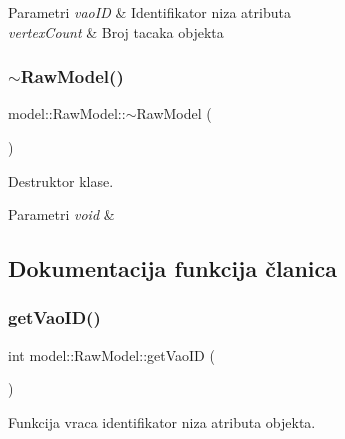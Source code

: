 \begin{DoxyParams}{Parametri}
{\em vao\+ID} & Identifikator niza atributa \\
\hline
{\em vertex\+Count} & Broj tacaka objekta \\
\hline
\end{DoxyParams}
\mbox{\label{classmodel_1_1RawModel_a44e687484478b0747abe25baa3533b71}} 
\subsubsection{\texorpdfstring{$\sim$\+Raw\+Model()}{~RawModel()}}
{\footnotesize\ttfamily model\+::\+Raw\+Model\+::$\sim$\+Raw\+Model (\begin{DoxyParamCaption}{ }\end{DoxyParamCaption})}



Destruktor klase. 


\begin{DoxyParams}{Parametri}
{\em void} & \\
\hline
\end{DoxyParams}


\subsection{Dokumentacija funkcija članica}
\mbox{\label{classmodel_1_1RawModel_a8132ec85cbc5f5286534ed6d67ee69ad}} 
\subsubsection{\texorpdfstring{get\+Vao\+I\+D()}{getVaoID()}}
{\footnotesize\ttfamily int model\+::\+Raw\+Model\+::get\+Vao\+ID (\begin{DoxyParamCaption}\item[{void}]{ }\end{DoxyParamCaption})}



Funkcija vraca identifikator niza atributa objekta. 


